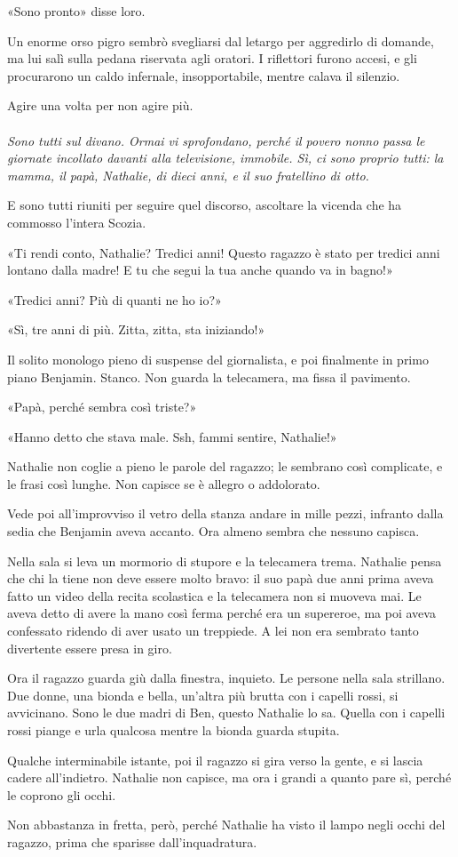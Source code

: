 \documentclass[a4paper,12pt]{book}
\begin{document}
«Sono pronto» disse loro.

Un enorme orso pigro sembrò svegliarsi dal letargo per aggredirlo di domande,
ma lui salì sulla pedana riservata agli oratori. I riflettori furono accesi, e
gli procurarono un caldo infernale, insopportabile, mentre calava il silenzio.

Agire una volta per non agire più.

\paragraph{}
{\itshape
Sono tutti sul divano. Ormai vi sprofondano, perché il povero nonno passa le
giornate incollato davanti alla televisione, immobile. Sì, ci sono proprio
tutti: la mamma, il papà, Nathalie, di dieci anni, e il suo fratellino di otto.

E sono tutti riuniti per seguire quel discorso, ascoltare la vicenda che ha
commosso l’intera Scozia.

«Ti rendi conto, Nathalie? Tredici anni! Questo ragazzo è stato per tredici
anni lontano dalla madre! E tu che segui la tua anche quando va in bagno!»

«Tredici anni? Più di quanti ne ho io?»

«Sì, tre anni di più. Zitta, zitta, sta iniziando!»

Il solito monologo pieno di suspense del giornalista, e poi finalmente in primo
piano Benjamin. Stanco. Non guarda la telecamera, ma fissa il pavimento.

«Papà, perché sembra così triste?»

«Hanno detto che stava male. Ssh, fammi sentire, Nathalie!»

Nathalie non coglie a pieno le parole del ragazzo; le sembrano così complicate,
e le frasi così lunghe. Non capisce se è allegro o addolorato.

Vede poi all’improvviso il vetro della stanza andare in mille pezzi, infranto
dalla sedia che Benjamin aveva accanto. Ora almeno sembra che nessuno capisca.

Nella sala si leva un mormorio di stupore e la telecamera trema. Nathalie pensa
che chi la tiene non deve essere molto bravo: il suo papà due anni prima aveva
fatto un video della recita scolastica e la telecamera non si muoveva mai. Le
aveva detto di avere la mano così ferma perché era un supereroe, ma poi aveva
confessato ridendo di aver usato un treppiede. A lei non era sembrato tanto
divertente essere presa in giro.

Ora il ragazzo guarda giù dalla finestra, inquieto. Le persone nella sala
strillano. Due donne, una bionda e bella, un’altra più brutta con i capelli
rossi, si avvicinano. Sono le due madri di Ben, questo Nathalie lo sa. Quella
con i capelli rossi piange e urla qualcosa mentre la bionda guarda stupita.

Qualche interminabile istante, poi il ragazzo si gira verso la gente, e si
lascia cadere all’indietro. Nathalie non capisce, ma ora i grandi a quanto
pare sì, perché le coprono gli occhi.

Non abbastanza in fretta, però, perché Nathalie ha visto il lampo negli occhi
del ragazzo, prima che sparisse dall’inquadratura.
\/}

\tableofcontents
\end{document}
